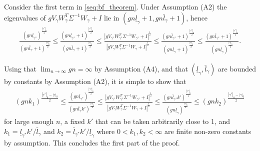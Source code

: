 Consider the first term in \eqref{seq:bf_theorem}. Under Assumption (A2) the eigenvalues of $g V_{\gamma} W_{\gamma}^T \Sigma^{-1} W_{\gamma} + I$
lie in $(gn \underline{l}_\gamma + 1, g n \bar{l}_\gamma + 1)$, hence
\begin{align}
\frac{(g n \underline{l}_{\gamma^*})^{\frac{|\gamma^*|_0}{2}}}{(g n \bar{l}_{\gamma} + 1)^{\frac{|\gamma|_0}{2}}}
\leq
\frac{(g n \underline{l}_{\gamma^*} + 1)^{\frac{|\gamma^*|_0}{2}}}{(g n \bar{l}_{\gamma} + 1)^{\frac{|\gamma|_0}{2}}}
\leq
\frac{\left|g V_{\gamma^*} W_{\gamma^*}^T \Sigma^{-1} W_{\gamma^*}  + I \right|^{\frac{1}{2}}}{\left| g V_{\gamma} W_{\gamma}^T \Sigma^{-1} W_\gamma  + I \right|^{\frac{1}{2}}}
\leq
\frac{(g n \bar{l}_{\gamma^*} + 1)^{\frac{|\gamma^*|_0}{2}}}{(g n \underline{l}_{\gamma} + 1)^{\frac{|\gamma|_0}{2}}}
\leq
\frac{(g n \bar{l}_{\gamma^*} + 1)^{\frac{|\gamma^*|_0}{2}}}{(g n \underline{l}_{\gamma})^{\frac{|\gamma|_0}{2}}}.
\nonumber
\end{align}

Using that $\lim_{n \rightarrow \infty} g n= \infty$ by Assumption (A4), and that $(\underline{l}_\gamma,\bar{l}_\gamma)$ are bounded by constants by Assumption (A2),
it is simple to show that 
\begin{align}
(g n k_1)^{\frac{|\gamma^*|_0-|\gamma|_0}{2}}
\leq
\frac{(g n \underline{l}_{\gamma^*})^{\frac{|\gamma^*|_0}{2}}}{(g n \bar{l}_{\gamma} k')^{\frac{|\gamma|_0}{2}}}
\leq
\frac{\left|g V_{\gamma^*} W_{\gamma^*}^T \Sigma^{-1} W_{\gamma^*}  + I \right|^{\frac{1}{2}}}{\left| g V_{\gamma} W_{\gamma}^T \Sigma^{-1} W_\gamma  + I \right|^{\frac{1}{2}}}
\leq
\frac{(g n \bar{l}_{\gamma^*} k')^{\frac{|\gamma^*|_0}{2}}}{(g n \underline{l}_{\gamma})^{\frac{|\gamma|_0}{2}}}
\leq (g n k_2)^{\frac{|\gamma^*|_0-|\gamma|_0}{2}}
\label{seq:bf_term1}
\end{align}
for large enough $n$, a fixed $k'$ that can be taken arbitrarily close to 1, and 
$k_1= \underline{l}_{\gamma^*} k' / \bar{l}_\gamma$ and $k_2= \bar{l}_{\gamma^*} k' / \underline{l}_\gamma$
where $0 < k_1,k_2 < \infty$ are finite non-zero constants by assumption.
This concludes the first part of the proof.


